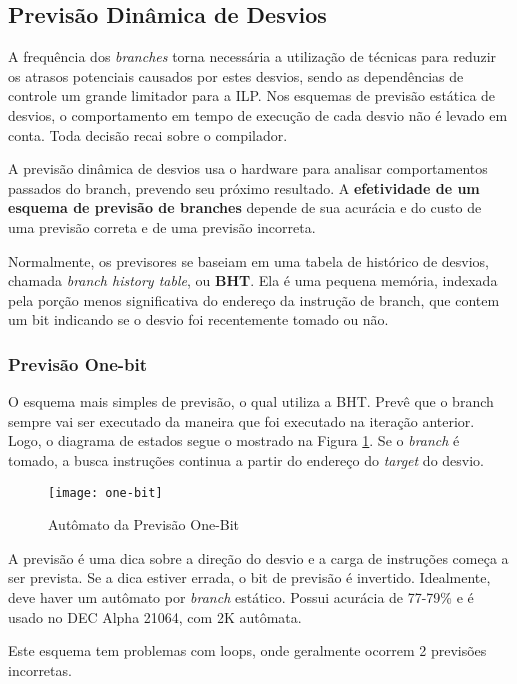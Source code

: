 \subsection{Previsão Dinâmica de Desvios}
A frequência dos \textit{branches} torna necessária a utilização de técnicas para reduzir os atrasos potenciais causados por estes desvios, sendo as dependências de controle um grande limitador para a ILP. Nos esquemas de previsão estática de desvios, o comportamento em tempo de execução de cada desvio não é levado em conta. Toda decisão recai sobre o compilador.

A previsão dinâmica de desvios usa o hardware para analisar comportamentos
passados do branch, prevendo seu próximo resultado. A \textbf{efetividade de um esquema de previsão de branches} depende de sua acurácia e do custo de uma previsão correta e de uma previsão incorreta.

Normalmente, os previsores se baseiam em uma tabela de histórico de desvios, chamada \textit{branch history table}, ou \textbf{BHT}. Ela é uma pequena memória, indexada pela porção menos significativa do endereço da instrução de branch, que contem um bit indicando se o desvio foi recentemente tomado ou não.


\subsubsection{Previsão One-bit}
O esquema mais simples de previsão, o qual utiliza a BHT. Prevê que o branch sempre vai ser executado da maneira que foi executado na iteração anterior. Logo, o diagrama de estados segue o mostrado na Figura \ref{fig:one-bit}. Se o \textit{branch} é tomado, a busca instruções continua a partir do endereço do \textit{target} do desvio.

\begin{figure}[ht]
  \centering
  \texttt{[image: one-bit]}
  \caption{Autômato da Previsão One-Bit}
  \label{fig:one-bit}
\end{figure}

A previsão é uma dica sobre a direção do desvio e a carga de instruções começa a ser prevista. Se a dica estiver errada, o bit de previsão é invertido. Idealmente, deve haver um autômato por \textit{branch} estático. Possui acurácia de 77-79\% e é usado no DEC Alpha 21064, com 2K autômata.

Este esquema tem problemas com loops, onde geralmente ocorrem 2 previsões incorretas.




